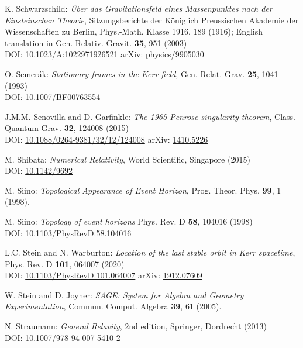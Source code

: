 \begin{thebibliography}{123}
K. Schwarzschild:
{\em \"Uber das Gravitationsfeld eines Massenpunktes nach der Einsteinschen Theorie},
Sitzungsberichte der K\"oniglich Preussischen Akademie der Wissenschaften zu Berlin, Phys.-Math. Klasse 1916, 189 (1916);
English translation in Gen. Relativ. Gravit. {\bf 35}, 951 (2003)\\
DOI: \href{https://doi.org/10.1023/A:1022971926521}{10.1023/A:1022971926521}\hfill
arXiv: \href{https://arxiv.org/abs/physics/9905030}{physics/9905030}

O. Semer\'ak:
{\em Stationary frames in the Kerr field},
Gen. Relat. Grav. {\bf 25}, 1041 (1993)\\
DOI: \href{https://doi.org/10.1007/BF00763554}{10.1007/BF00763554}

J.M.M. Senovilla and D. Garfinkle:
{\em The 1965 Penrose singularity theorem},
Class. Quantum Grav. {\bf 32}, 124008 (2015)\\
DOI: \href{https://doi.org/10.1088/0264-9381/32/12/124008}{10.1088/0264-9381/32/12/124008}\hfill
arXiv: \href{https://arxiv.org/abs/1410.5226}{1410.5226}

M. Shibata:
{\em Numerical Relativity},
World Scientific, Singapore (2015)\\
DOI: \href{https://doi.org/10.1142/9692}{10.1142/9692}

M. Siino: {\em Topological Appearance of Event Horizon},
Prog. Theor. Phys. {\bf 99}, 1 (1998).

M. Siino: {\em Topology of event horizons}
Phys. Rev. D {\bf 58}, 104016 (1998)\\
DOI: \href{https://doi.org/10.1103/PhysRevD.58.104016}{10.1103/PhysRevD.58.104016}

L.C. Stein and N. Warburton:
{\em Location of the last stable orbit in Kerr spacetime},
Phys. Rev. D  {\bf 101}, 064007 (2020)\\
DOI: \href{https://doi.org/10.1103/PhysRevD.101.064007}{10.1103/PhysRevD.101.064007}\hfill
arXiv: \href{https://arxiv.org/abs/1912.07609}{1912.07609}

W. Stein and D. Joyner: {\em SAGE: System for Algebra and Geometry Experimentation},
Commun. Comput. Algebra {\bf 39}, 61 (2005).

N. Straumann: \emph{General Relavity}, 2nd edition,
Springer, Dordrecht (2013)\\
DOI: \href{https://doi.org/10.1007/978-94-007-5410-2}{10.1007/978-94-007-5410-2}


\end{thebibliography}
